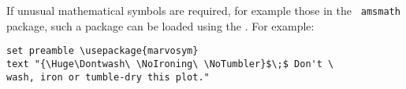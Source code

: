 If unusual mathematical symbols are required, for example those in the {\tt
amsmath} package, such a package
can be loaded using the . For example:

\begin{verbatim} 
set preamble \usepackage{marvosym}
text "{\Huge\Dontwash\ \NoIroning\ \NoTumbler}$\;$ Don't \
wash, iron or tumble-dry this plot."
\end{verbatim}

